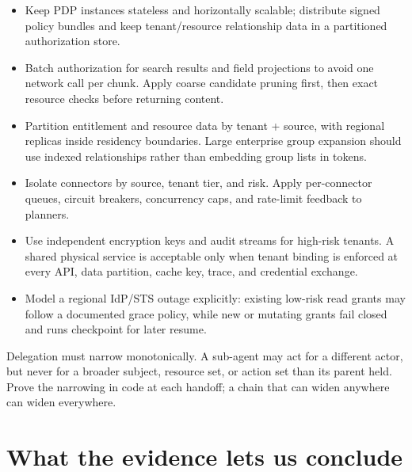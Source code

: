 \begin{itemize}

\item Keep PDP instances stateless and horizontally scalable; distribute signed policy bundles and keep tenant/resource relationship data in a partitioned authorization store.

\item Batch authorization for search results and field projections to avoid one network call per chunk. Apply coarse candidate pruning first, then exact resource checks before returning content.

\item Partition entitlement and resource data by tenant + source, with regional replicas inside residency boundaries. Large enterprise group expansion should use indexed relationships rather than embedding group lists in tokens.

\item Isolate connectors by source, tenant tier, and risk. Apply per-connector queues, circuit breakers, concurrency caps, and rate-limit feedback to planners.

\item Use independent encryption keys and audit streams for high-risk tenants. A shared physical service is acceptable only when tenant binding is enforced at every API, data partition, cache key, trace, and credential exchange.

\item Model a regional IdP/STS outage explicitly: existing low-risk read grants may follow a documented grace policy, while new or mutating grants fail closed and runs checkpoint for later resume.

\end{itemize}

\begin{booksecurity}
Delegation must narrow monotonically. A sub-agent may act for a different actor, but never for a broader subject, resource set, or action set than its parent held. Prove the narrowing in code at each handoff; a chain that can widen anywhere can widen everywhere.
\end{booksecurity}

\section{What the evidence lets us conclude}

